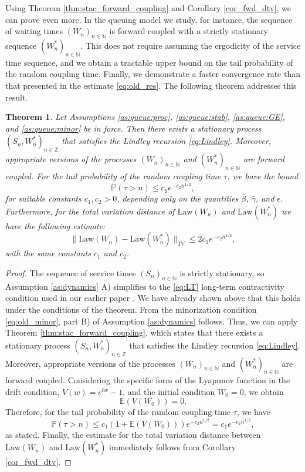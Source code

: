 \documentclass[a4paper,10pt]{article}
\newtheorem{theorem}{Theorem}[section]
\newcommand{\N}{\mathbb{N}}
\newcommand{\Z}{\mathbb{Z}}
\renewcommand{\P}{\mathbb{P}}
\newcommand{\E}{\mathbb{E}}
\newcommand{\law}[1]{\text{Law}(#1)}
\begin{document}
Using Theorem \ref{thm:stac_forward_coupling} and Corollary \ref{cor_fwd_dtv}, we can prove even more. In the queuing model we study, for instance, the sequence of waiting times $(W_n)_{n\in\N}$ is forward coupled with a strictly stationary sequence $(W_n^*)_{n\in\N}$. This does not require assuming the ergodicity of the service time sequence, and we obtain a tractable upper bound on the tail probability of the random coupling time. Finally, we demonstrate a faster convergence rate than that presented in the estimate \eqref{eq:old_res}. The following theorem addresses this result.
\begin{theorem}\label{thm:queue:stac}
	Let Assumptions \ref{as:queue:proc}, \ref{as:queue:stab}, \ref{as:queue:GE}, and \ref{as:queue:minor} be in force. Then there exists a stationary process $(S_n, W_n^*)_{n\in\Z}$ that satisfies the Lindley recursion \eqref{eq:Lindley}. Moreover, appropriate versions of the processes $(W_n)_{n\in\N}$ and $(W_n^*)_{n\in\N}$ are forward coupled. For the tail probability of the random coupling time $\tau$, we have the bound
	$$
	\P(\tau > n) \leq c_1 e^{-c_2 n^{1/2}},
	$$
	for suitable constants $c_1, c_2 > 0$, depending only on the quantities $\bar{\beta}$, $\bar{\gamma}$, and $\epsilon$. Furthermore, for the total variation distance of $\law{W_n}$ and $\law{W_n^*}$ we have the following estimate:
	$$
	\lVert \law{W_n} - \law{W_n^\ast} \rVert_{TV}
	\leq
	2 c_1 e^{-c_2 n^{1/2}},
	$$
	with the same constants $c_1$ and $c_2$.
\end{theorem}
\begin{proof}
	The sequence of service times $(S_n)_{n\in\N}$ is strictly stationary, so Assumption \ref{as:dynamics} A) simplifies to the \eqref{eq:LT} long-term contractivity condition used in our earlier paper \cite{lovas}. We have already shown above that this holds under the conditions of the theorem. From the minorization condition \eqref{eq:old_minor}, part B) of Assumption \ref{as:dynamics} follows. Thus, we can apply Theorem \ref{thm:stac_forward_coupling}, which states that there exists a stationary process $(S_n, W_n^*)_{n\in\Z}$ that satisfies the Lindley recursion \eqref{eq:Lindley}. Moreover, appropriate versions of the processes $(W_n)_{n\in\N}$ and $(W_n^*)_{n\in\N}$ are forward coupled. Considering the specific form of the Lyapunov function in the drift condition, $V(w) = e^{\bar{t}w} - 1$, and the initial condition $W_0 = 0$, we obtain
	$$
	\E (V(W_0)) = 0.
	$$
	Therefore, for the tail probability of the random coupling time $\tau$, we have
	$$
	\P(\tau > n) \leq c_1 (1 + \E (V(W_0))) e^{-c_2 n^{1/2}} = c_1 e^{-c_2 n^{1/2}},
	$$
	as stated. Finally, the estimate for the total variation distance between $\law{W_n}$ and $\law{W_n^*}$ immediately follows from Corollary \ref{cor_fwd_dtv}.
\end{proof}
\end{document}
